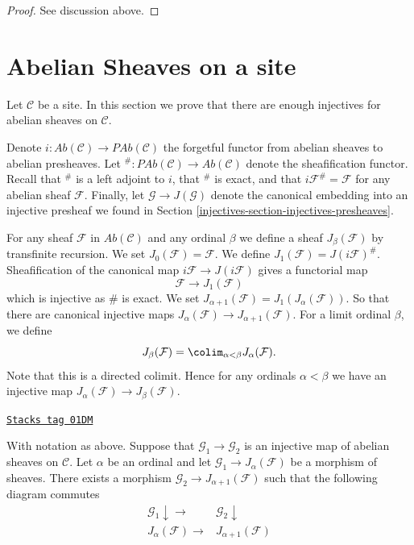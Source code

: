 \begin{proof}
See discussion above.
\end{proof}

\section{Abelian Sheaves on a site}
\label{injectives-section-injectives-sheaves}
Let $\mathcal{C}$ be a site. In this section we prove that there are
enough injectives for abelian sheaves on $\mathcal{C}$.

\medskip\noindent
Denote
$i : \textit{Ab}(\mathcal{C}) \longrightarrow \textit{PAb}(\mathcal{C})$
the forgetful functor from abelian sheaves to abelian presheaves.
Let
${}^\# : \textit{PAb}(\mathcal{C}) \longrightarrow \textit{Ab}(\mathcal{C})$
denote the sheafification functor. Recall that ${}^\#$ is a left adjoint
to $i$, that ${}^\#$ is exact, and that $i\mathcal{F}^\# = \mathcal{F}$
for any abelian sheaf $\mathcal{F}$. Finally, let
$\mathcal{G} \to J(\mathcal{G})$ denote the canonical
embedding into an injective presheaf we found in
Section \ref{injectives-section-injectives-presheaves}.

\medskip\noindent
For any sheaf $\mathcal{F}$ in $\textit{Ab}(\mathcal{C})$ and
any ordinal $\beta$ we define a sheaf
$J_\beta(\mathcal{F})$ by transfinite recursion.
We set $J_0(\mathcal{F}) = \mathcal{F}$.
We define $J_1(\mathcal{F}) = J(i\mathcal{F})^\#$.
Sheafification of the canonical map $i\mathcal{F} \to J(i\mathcal{F})$
gives a functorial map
$$
\mathcal{F} \longrightarrow J_1(\mathcal{F})
$$
which is injective as $\#$ is exact. We set
$J_{\alpha + 1}(\mathcal{F}) = J_1(J_\alpha(\mathcal{F}))$.
So that there are canonical injective maps
$J_\alpha(\mathcal{F}) \to J_{\alpha + 1}(\mathcal{F})$.
For a limit ordinal $\beta$, we define
$$
J_\beta(\mathcal{F}) = \colim_{\alpha < \beta} J_\alpha(\mathcal{F}).
$$
Note that this is a directed colimit. Hence for any ordinals $\alpha < \beta$
we have an injective map $J_\alpha(\mathcal{F}) \to J_\beta(\mathcal{F})$.

\begin{lemma}
\label{injectives-lemma-map-into-next-one}
\href{https://stacks.math.columbia.edu/tag/01DM}{\texttt{Stacks tag 01DM}}

With notation as above.
Suppose that $\mathcal{G}_1 \to \mathcal{G}_2$ is an injective
map of abelian sheaves on $\mathcal{C}$. Let $\alpha$ be an ordinal
and let $\mathcal{G}_1 \to J_\alpha(\mathcal{F})$ be a morphism
of sheaves. There exists a morphism $\mathcal{G}_2 \to
J_{\alpha + 1}(\mathcal{F})$ such that the following diagram commutes
$$
\begin{array}{cc}\mathcal{G}_1 \downarrow\longrightarrow & \mathcal{G}_2 \downarrow \\ J_{\alpha}(\mathcal{F}) \longrightarrow & J_{\alpha + 1}(\mathcal{F})\end{array}
$$
\end{lemma}


